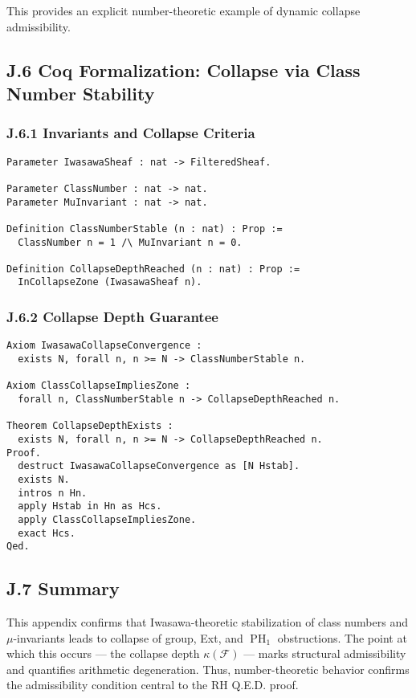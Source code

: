 \documentclass[11pt]{article}
\DeclareMathOperator{\PH}{PH}
\begin{document}
This provides an explicit number-theoretic example of dynamic collapse admissibility.

\subsection*{J.6 Coq Formalization: Collapse via Class Number Stability}

\subsubsection*{J.6.1 Invariants and Collapse Criteria}

\begin{lstlisting}[language=Coq, caption=Iwasawa Collapse Conditions, captionpos=b]
Parameter IwasawaSheaf : nat -> FilteredSheaf.

Parameter ClassNumber : nat -> nat.
Parameter MuInvariant : nat -> nat.

Definition ClassNumberStable (n : nat) : Prop :=
  ClassNumber n = 1 /\ MuInvariant n = 0.

Definition CollapseDepthReached (n : nat) : Prop :=
  InCollapseZone (IwasawaSheaf n).
\end{lstlisting}

\subsubsection*{J.6.2 Collapse Depth Guarantee}

\begin{lstlisting}[language=Coq, caption=Collapse Depth Existence, captionpos=b]
Axiom IwasawaCollapseConvergence :
  exists N, forall n, n >= N -> ClassNumberStable n.

Axiom ClassCollapseImpliesZone :
  forall n, ClassNumberStable n -> CollapseDepthReached n.

Theorem CollapseDepthExists :
  exists N, forall n, n >= N -> CollapseDepthReached n.
Proof.
  destruct IwasawaCollapseConvergence as [N Hstab].
  exists N.
  intros n Hn.
  apply Hstab in Hn as Hcs.
  apply ClassCollapseImpliesZone.
  exact Hcs.
Qed.
\end{lstlisting}

\subsection*{J.7 Summary}

This appendix confirms that Iwasawa-theoretic stabilization of class numbers and $\mu$-invariants leads to collapse of group, Ext, and \(\PH_1\) obstructions. The point at which this occurs — the collapse depth \( \kappa(\mathcal{F}) \) — marks structural admissibility and quantifies arithmetic degeneration. Thus, number-theoretic behavior confirms the admissibility condition central to the RH Q.E.D. proof.
\end{document}
